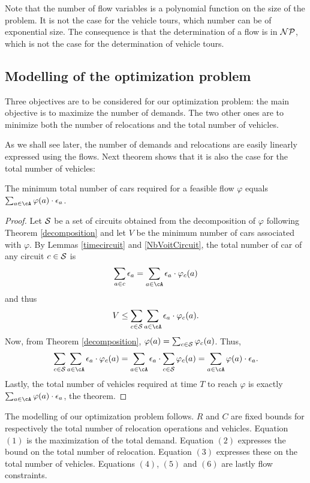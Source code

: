 \begin{bibunit}[ieeetr]
Note that the  number of flow variables is a polynomial function on the size of the problem.
It is not the case for the vehicle tours, which number can be of exponential size.
The consequence is that the determination of a flow is in ${\cal NP}$, which is not the case for the determination of vehicle tours.

\subsection{Modelling of the optimization problem}
Three objectives are to be considered for our optimization problem: the main objective is to maximize the number of demands. The two other ones are to minimize both the number of relocations and the total number of vehicles.

As we shall see later, the number of demands and relocations are easily linearly expressed using the flows. Next theorem shows that it is also the case for the total number of vehicles:

\begin{theorem} \label{NbVoiture}
The minimum total number of cars required for a feasible flow $\varphi$ equals
$\sum_{a\in \cA} \varphi(a) \cdot \epsilon_a$.
\end{theorem}
\begin{proof}
Let ${\cal S}$ be a set of circuits obtained from the decomposition of $\varphi$
following Theorem \ref{decomposition} and let $V$ be the minimum number
of cars associated with $\varphi$.
By Lemmas  \ref{timecircuit} and \ref{NbVoitCircuit}, the total number of car of any circuit $c\in {\cal S}$ is
$$\sum_{a\in c} \epsilon_a = \sum_{a\in {\cA}} \epsilon_a \cdot \varphi_c(a)$$
and thus
$$V \leq \sum_{c\in {\cal S}} \sum_{a\in {\cA}} \epsilon_a \cdot \varphi_c(a).$$
Now, from  Theorem \ref{decomposition}, $\varphi (a)= \sum_{c\in {\cal S}}\varphi_c(a)$.
Thus, 
$$\sum_{c\in {\cal S}} \sum_{a\in {\cA}} \epsilon_a \cdot \varphi_c(a)=\sum_{a\in {\cA}} \epsilon_a \cdot \sum_{c\in {\cal S}}  \varphi_c(a)=\sum_{a\in {\cA}} \varphi(a) \cdot \epsilon_a.$$
Lastly, the total number of vehicles required at time $T$ to reach $\varphi$ is exactly $\sum_{a\in {\cA}} \varphi(a) \cdot \epsilon_a$, the theorem.
\end{proof}

The modelling of our optimization problem follows. $R$ and $C$ are fixed bounds for respectively  the total number of relocation operations and vehicles.
Equation $(1)$ is the maximization of the total demand.
Equation $(2)$ expresses the bound on the total number of relocation.
Equation $(3)$ expresses these on the total number of vehicles.
Equations $(4)$, $(5)$ and $(6)$ are lastly flow constraints.


\end{bibunit}
